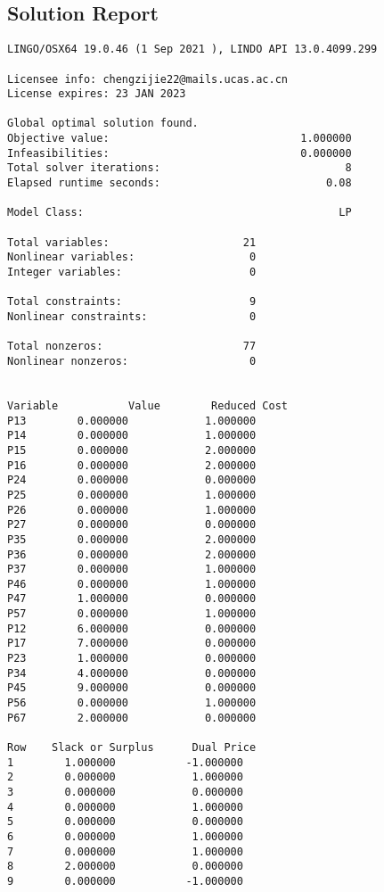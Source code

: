 \documentclass[12pt]{article}
\begin{document}
\begin{appendices}
\subsection{Solution Report}
\begin{lstlisting}
LINGO/OSX64 19.0.46 (1 Sep 2021 ), LINDO API 13.0.4099.299

Licensee info: chengzijie22@mails.ucas.ac.cn  
License expires: 23 JAN 2023

Global optimal solution found.
Objective value:                              1.000000
Infeasibilities:                              0.000000
Total solver iterations:                             8
Elapsed runtime seconds:                          0.08

Model Class:                                        LP

Total variables:                     21
Nonlinear variables:                  0
Integer variables:                    0

Total constraints:                    9
Nonlinear constraints:                0

Total nonzeros:                      77
Nonlinear nonzeros:                   0


Variable           Value        Reduced Cost
P13        0.000000            1.000000
P14        0.000000            1.000000
P15        0.000000            2.000000
P16        0.000000            2.000000
P24        0.000000            0.000000
P25        0.000000            1.000000
P26        0.000000            1.000000
P27        0.000000            0.000000
P35        0.000000            2.000000
P36        0.000000            2.000000
P37        0.000000            1.000000
P46        0.000000            1.000000
P47        1.000000            0.000000
P57        0.000000            1.000000
P12        6.000000            0.000000
P17        7.000000            0.000000
P23        1.000000            0.000000
P34        4.000000            0.000000
P45        9.000000            0.000000
P56        0.000000            1.000000
P67        2.000000            0.000000

Row    Slack or Surplus      Dual Price
1        1.000000           -1.000000
2        0.000000            1.000000
3        0.000000            0.000000
4        0.000000            1.000000
5        0.000000            0.000000
6        0.000000            1.000000
7        0.000000            1.000000
8        2.000000            0.000000
9        0.000000           -1.000000
\end{lstlisting}
\end{appendices}
	
\end{document}
